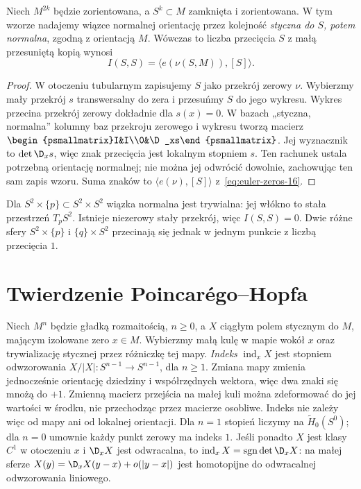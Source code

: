 \begin{wniosek}[Samoprzecięcie]
\label{cor:samoprzeciecie-16}
Niech $M^{2k}$ będzie zorientowana, a
$S^k\subset M$ zamknięta i zorientowana.
W tym wzorze nadajemy wiązce normalnej orientację
przez kolejność \emph{styczna do $S$, potem normalna},
zgodną z orientacją $M$. Wówczas
to liczba przecięcia
$S$ z małą przesuniętą
kopią wynosi
\[
 I(S,S)=\langle e(\nu(S,M)),[S]\rangle.
\]
\end{wniosek}
\begin{proof}
W otoczeniu tubularnym
zapisujemy $S$ jako
przekrój zerowy $\nu$.
Wybierzmy mały przekrój
$s$ transwersalny do
zera i przesuńmy $S$
do jego wykresu.
Wykres przecina
przekrój zerowy
dokładnie dla $s(x)=0$.
W bazach „styczna, normalna” kolumny baz
przekroju zerowego i wykresu tworzą macierz
$\begin{psmallmatrix}I&I\\0&\D_xs\end{psmallmatrix}$.
Jej wyznacznik to $\det\D_xs$, więc znak przecięcia
jest lokalnym stopniem $s$. Ten rachunek ustala
potrzebną orientację normalnej; nie można jej
odwrócić dowolnie, zachowując ten sam zapis wzoru.
Suma znaków to
$\langle e(\nu),[S]\rangle$
z~\eqref{eq:euler-zeros-16}.
\end{proof}

\begin{przyklad}
Dla $S^2\times\{p\}
\subset S^2\times S^2$
wiązka normalna jest
trywialna: jej włókno
to stała przestrzeń
$T_pS^2$. Istnieje
niezerowy stały
przekrój, więc
$I(S,S)=0$.
Dwie różne sfery
$S^2\times\{p\}$
i $\{q\}\times S^2$
przecinają się
jednak w jednym
punkcie z liczbą
przecięcia $1$.
\end{przyklad}

\section{Twierdzenie Poincarégo--Hopfa}
\label{sec:poincare-hopf-16}

\begin{definicja}
Niech $M^n$ będzie gładką rozmaitością, $n\geq0$,
a $X$ ciągłym polem stycznym do $M$, mającym
izolowane zero $x\in M$. Wybierzmy małą kulę w mapie wokół $x$
oraz trywializację stycznej przez różniczkę tej mapy.
\emph{Indeks} $\operatorname{ind}_x X$
jest stopniem odwzorowania
$X/|X|:S^{n-1}\to S^{n-1}$, dla $n\geq1$.
Zmiana mapy zmienia jednocześnie orientację dziedziny
i współrzędnych wektora, więc dwa znaki się mnożą
do $+1$. Zmienną macierz przejścia na małej kuli
można zdeformować do jej wartości w środku, nie
przechodząc przez macierze osobliwe. Indeks nie
zależy więc od mapy ani od lokalnej orientacji.
Dla $n=1$ stopień liczymy na $\widetilde H_0(S^0)$;
dla $n=0$ umownie każdy punkt zerowy ma indeks $1$.
Jeśli ponadto $X$ jest klasy $C^1$ w otoczeniu $x$
i $\D_xX$ jest
odwracalna, to
$\operatorname{ind}_xX
=\operatorname{sgn}\det\D_xX$:
na małej sferze
$X(y)=\D_xX(y-x)+o(|y-x|)$
jest homotopijne
do odwracalnej
odwzorowania liniowego.
\end{definicja}

